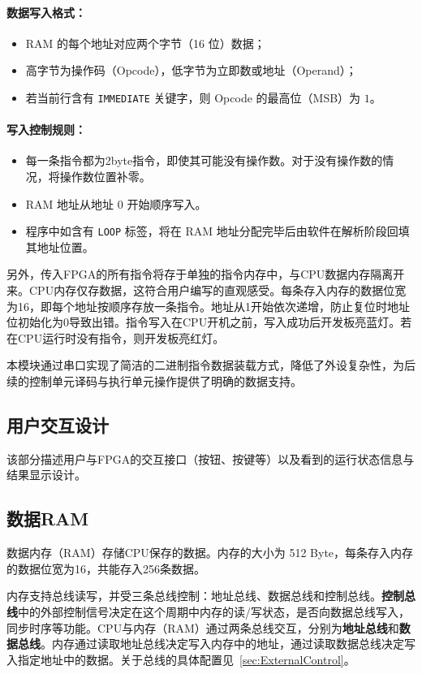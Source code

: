 \documentclass[lang=cn,a4paper,newtx]{elegantpaper}
\begin{document}
\paragraph{数据写入格式：}

\begin{itemize}
  \item RAM 的每个地址对应两个字节（16 位）数据；
  \item 高字节为操作码（Opcode），低字节为立即数或地址（Operand）；
  \item 若当前行含有 \texttt{IMMEDIATE} 关键字，则 Opcode 的最高位（MSB）为 $1$。
\end{itemize}

\paragraph{写入控制规则：}

\begin{itemize}
  \item 每一条指令都为2byte指令，即使其可能没有操作数。对于没有操作数的情况，将操作数位置补零。
  \item RAM 地址从地址 0 开始顺序写入。
  \item 程序中如含有 \texttt{LOOP} 标签，将在 RAM 地址分配完毕后由软件在解析阶段回填其地址位置。
\end{itemize}

另外，传入FPGA的所有指令将存于单独的指令内存中，与CPU数据内存隔离开来。CPU内存仅存数据，这符合用户编写的直观感受。每条存入内存的数据位宽为16，即每个地址按顺序存放一条指令。地址从1开始依次递增，防止复位时地址位初始化为0导致出错。指令写入在CPU开机之前，写入成功后开发板亮蓝灯。若在CPU运行时没有指令，则开发板亮红灯。

本模块通过串口实现了简洁的二进制指令数据装载方式，降低了外设复杂性，为后续的控制单元译码与执行单元操作提供了明确的数据支持。

\subsection{用户交互设计}\label{sec:interaction}
该部分描述用户与FPGA的交互接口（按钮、按键等）以及看到的运行状态信息与结果显示设计。
\subsection{数据RAM}
数据内存（RAM）存储CPU保存的数据。内存的大小为 512 Byte，每条存入内存的数据位宽为16，共能存入256条数据。

内存支持总线读写，并受三条总线控制：地址总线、数据总线和控制总线。\textbf{控制总线}中的外部控制信号决定在这个周期中内存的读/写状态，是否向数据总线写入，同步时序等功能。CPU与内存（RAM）通过两条总线交互，分别为\textbf{地址总线}和\textbf{数据总线}。内存通过读取地址总线决定写入内存中的地址，通过读取数据总线决定写入指定地址中的数据。关于总线的具体配置见~\ref{sec:ExternalControl}。
\end{document}
